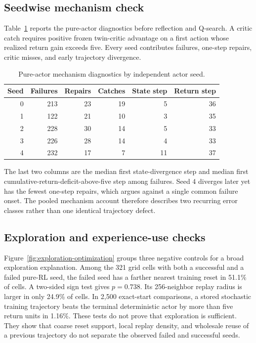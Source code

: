 \documentclass[10pt,twocolumn]{article}
\begin{document}
\subsection{Seedwise mechanism check}

Table~\ref{tab:seedwise-mechanism} reports the pure-actor diagnostics before reflection and Q-search. A critic catch requires positive frozen twin-critic advantage on a first action whose realized return gain exceeds five. Every seed contributes failures, one-step repairs, critic misses, and early trajectory divergence.

\begin{table}[h]
\centering
\scriptsize
\setlength{\tabcolsep}{3pt}
\caption{Pure-actor mechanism diagnostics by independent actor seed.}
\label{tab:seedwise-mechanism}
\begin{tabular}{rrrrrr}
\toprule
Seed & Failures & Repairs & Catches & State step & Return step\\
\midrule
0 & 213 & 23 & 19 & 5 & 36\\
1 & 122 & 21 & 10 & 3 & 35\\
2 & 228 & 30 & 14 & 5 & 33\\
3 & 226 & 28 & 14 & 4 & 33\\
4 & 232 & 17 & 7 & 11 & 37\\
\bottomrule
\end{tabular}
\end{table}

\enlargethispage{2\baselineskip}
The last two columns are the median first state-divergence step and median first cumulative-return-deficit-above-five step among failures. Seed 4 diverges later yet has the fewest one-step repairs, which argues against a single common failure onset. The pooled mechanism account therefore describes two recurring error classes rather than one identical trajectory defect.

\clearpage
\subsection{Exploration and experience-use checks}

Figure~\ref{fig:exploration-optimization} groups three negative controls for a broad exploration explanation. Among the 321 grid cells with both a successful and a failed pure-RL seed, the failed seed has a farther nearest training reset in 51.1\% of cells. A two-sided sign test gives $p=0.738$. Its 256-neighbor replay radius is larger in only 24.9\% of cells. In 2,500 exact-start comparisons, a stored stochastic training trajectory beats the terminal deterministic actor by more than five return units in 1.16\%. These tests do not prove that exploration is sufficient. They show that coarse reset support, local replay density, and wholesale reuse of a previous trajectory do not separate the observed failed and successful seeds.
\end{document}
